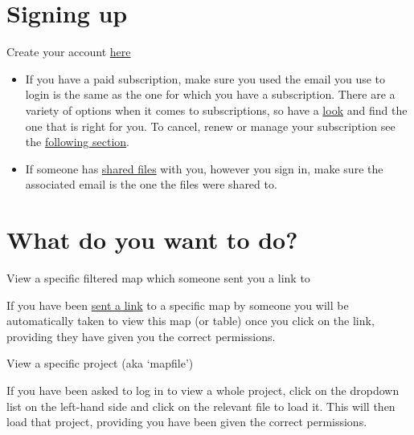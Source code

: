 \documentclass[
]{book}
\begin{document}
\hypertarget{signing-up}{%
\section{Signing up}\label{signing-up}}

Create your account \href{https://causalmap.shinyapps.io/CausalMap2/}{here}

\begin{itemize}
\item
  If you have a paid subscription, make sure you used the email you use to login is the same as the one for which you have a subscription. There are a variety of options when it comes to subscriptions, so have a \href{https://causalmap.app/subscriptions/}{look} and find the one that is right for you. To cancel, renew or manage your subscription see the \protect\hyperlink{xmanage_your_subscription}{following section}.
\item
  If someone has \protect\hyperlink{xpermissions}{shared files} with you, however you sign in, make sure the associated email is the one the files were shared to.
\end{itemize}

\hypertarget{what-do-you-want-to-do}{%
\section{What do you want to do?}\label{what-do-you-want-to-do}}

View a specific filtered map which someone sent you a link to

If you have been \protect\hyperlink{xinvite}{sent a link} to a specific map by someone you will be automatically taken to view this map (or table) once you click on the link, providing they have given you the correct permissions.

View a specific project (aka `mapfile')

If you have been asked to log in to view a whole project, click on the dropdown list on the left-hand side and click on the relevant file to load it. This will then load that project, providing you have been given the correct permissions.
\end{document}
